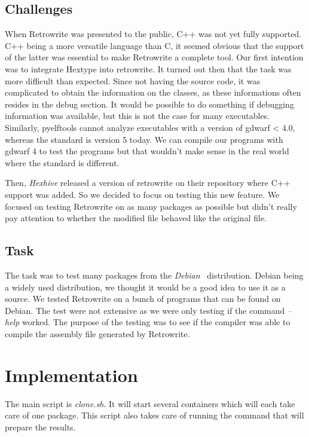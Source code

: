 \documentclass[a4paper,11pt,oneside]{report}
\newcommand{\sysname}{Retrowrite\xspace}
\begin{document}
\section{Challenges}
When Retrowrite was presented to the public, C++ was not yet fully supported. 
C++ being a more versatile language than C, it seemed obvious that the
support of the latter was essential to make Retrowrite a complete tool. Our
first intention was to integrate Hextype into retrowrite. It
turned out then that the task was more difficult than expected. Since not
having the source code, it was complicated to obtain the information on the
classes, as these informations often resides in the debug section. It would be
possible to do something if debugging information was available, but this is
not the case for many executables.
Similarly, pyelftools cannot analyze executables with a version of gdwarf <
4.0, whereas the standard is version 5 today. We can compile our programs with
gdwarf 4 to test the programs but that wouldn't make sense in the real world
where the standard is different.

Then, \textit{Hexhive} released a version of retrowrite on their repository
where C++ support was added. So we decided to focus on testing this new
feature.
We focused on testing \sysname on as many packages as possible but didn't
really pay attention to whether the modified file behaved like the original
file.

\section{Task}
The task was to test many packages from the
\textit{Debian}~\cite{debian} distribution. Debian being a widely used
distribution, we thought it would be a good idea to use it as a source. 
We tested Retrowrite on a bunch of programs that can be found on Debian.
The test were not extensive as we were only testing if the command
\textit{--help} worked. The purpose of the testing was to see if the compiler
was able to compile the assembly file generated by \sysname.


\chapter{Implementation}

The main script is \textit{clone.sh}. It will start several containers which will
each take care of one package. This script also takes care of running the
command that will prepare the results.
\end{document}
